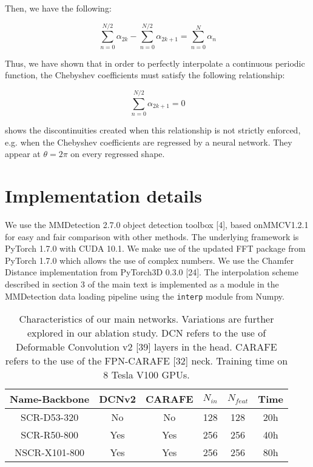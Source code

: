\documentclass[10pt,twocolumn,letterpaper]{article}
\begin{document}
Then, we have the following:

\begin{equation}
    \sum_{n=0}^{N/2} \alpha_{2k} - \sum_{n=0}^{N/2} \alpha_{2k+1} = \sum_{n=0}^{N} \alpha_{n} 
\end{equation}

Thus, we have shown that in order to perfectly interpolate
a continuous periodic function, the Chebyshev coefficients
must satisfy the following relationship:

\begin{equation}
    \sum_{n=0}^{N/2} \alpha_{2k+1} = 0
\end{equation}

 shows the discontinuities created when this relationship
is not strictly enforced, e.g. when the Chebyshev
coefficients are regressed by a neural network. They appear
at $\theta = 2 \pi$ on every regressed shape.

\section{Implementation details}

We use the MMDetection 2.7.0 object detection toolbox
[4], based onMMCV1.2.1 for easy and fair comparison
with other methods. The underlying framework is PyTorch
1.7.0 with CUDA 10.1. We make use of the updated FFT
package from PyTorch 1.7.0 which allows the use of complex
numbers. We use the Chamfer Distance implementation
from PyTorch3D 0.3.0 [24]. The interpolation scheme
described in section 3 of the main text is implemented as a
module in the MMDetection data loading pipeline using the
\texttt{interp} module from Numpy.

\begin{table}[H]
    \centering
    \begin{tabular}{c|c|c|c|c|c}
         Name-Backbone & DCNv2 & CARAFE & $N_{in}$  & $N_{feat}$ & Time \\
         \hline
         SCR-D53-320 & No & No & 128 & 128 & 20h \\
         SCR-R50-800 & Yes & Yes & 256 & 256 & 40h \\
         NSCR-X101-800 &  Yes &  Yes &  256 &  256 & 80h \\
    \end{tabular}
    \caption{Characteristics of our main networks. Variations are further
explored in our ablation study. DCN refers to the use of Deformable
Convolution v2 [39] layers in the head. CARAFE refers
to the use of the FPN-CARAFE [32] neck. Training time on 8
Tesla V100 GPUs.}
    \label{tab:tabl}
\end{table}
\end{document}
